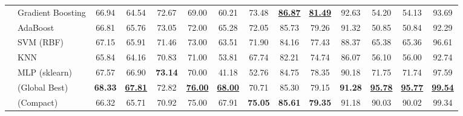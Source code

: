 \begin{table}[t]
{\begin{tabular}{ll ccc ccc ccc ccc}
 & Gradient Boosting & 66.94 & 64.54 & 72.67 & 69.00 & 60.21 & 73.48 & \underline{\textbf{86.87}} & \underline{\textbf{81.49}} & 92.63 & 54.20 & 54.13 & 93.69 \\
 & AdaBoost & 66.81 & 65.76 & 73.05 & 72.00 & 65.28 & 72.05 & 85.73 & 79.26 & 91.32 & 50.85 & 50.84 & 92.29 \\
\midrule
{} & SVM (RBF) & 67.15 & 65.91 & 71.46 & 73.00 & 63.51 & 71.90 & 84.16 & 77.43 & 88.37 & 65.38 & 65.36 & 96.61 \\
 & KNN & 65.84 & 64.16 & 70.83 & 71.00 & 53.81 & 67.74 & 82.21 & 74.74 & 86.07 & 56.10 & 56.00 & 92.74 \\
 & MLP (sklearn) & 67.57 & 66.90 & \textbf{73.14} & 70.00 & 41.18 & 52.76 & 84.75 & 78.35 & 90.18 & 71.75 & 71.74 & 97.59 \\
 & \modelname{} (Global Best) & \textbf{68.33} & \underline{\textbf{67.81}} & 72.82 & \underline{\textbf{76.00}} & \underline{\textbf{68.00}} & 70.71 & 85.30 & 79.15 & \textbf{91.28} & \underline{\textbf{95.78}} & \underline{\textbf{95.77}} & \underline{\textbf{99.54}} \\
 & \modelname{} (Compact) & 66.32 & 65.71 & 70.92 & 75.00 & 67.91 & \textbf{75.05} & \textbf{85.61} & \textbf{79.35} & 91.18 & 90.03 & 90.02 & 99.34 \\
\bottomrule
\end{tabular}
}
\end{table}
